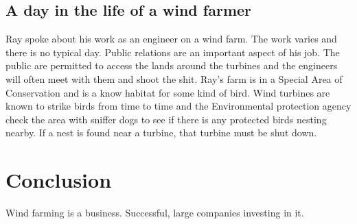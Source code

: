 \documentclass[12pt]{article} %
\begin{document}
\subsection{A day in the life of a wind farmer}
Ray spoke about his work as an engineer on a wind farm. The work varies and there is no typical day. Public relations are an important aspect of his job. The public are permitted to access the lands around the turbines and the engineers will often meet with them and shoot the shit.
Ray's farm is in a Special Area of Conservation and is a know habitat for some kind of bird.
Wind turbines are known to strike birds from time to time and the Environmental protection agency check the area with sniffer dogs to see if there is any protected birds nesting nearby. If a nest is found near a turbine, that turbine must be shut down.


\section{Conclusion}
Wind farming is a business.
Successful, large companies investing in it.


\printbibliography

\end{document}
